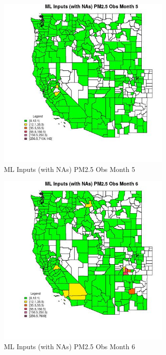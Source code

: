 \begin{figure} 
\centering  
\includegraphics[width=0.77\textwidth]{Code_Outputs/Report_ML_input_PM25_Step4_part_f_de_duplicated_aves_prioritize_24hr_obswNAs_CountyPM25_ObsmedianMonth5.jpg} 
\caption{\label{fig:Report_ML_input_PM25_Step4_part_f_de_duplicated_aves_prioritize_24hr_obswNAsCountyPM25_ObsmedianMonth5}ML Inputs (with NAs) PM2.5 Obs Month 5} 
\end{figure} 
 

\begin{figure} 
\centering  
\includegraphics[width=0.77\textwidth]{Code_Outputs/Report_ML_input_PM25_Step4_part_f_de_duplicated_aves_prioritize_24hr_obswNAs_CountyPM25_ObsmedianMonth6.jpg} 
\caption{\label{fig:Report_ML_input_PM25_Step4_part_f_de_duplicated_aves_prioritize_24hr_obswNAsCountyPM25_ObsmedianMonth6}ML Inputs (with NAs) PM2.5 Obs Month 6} 
\end{figure} 
 

